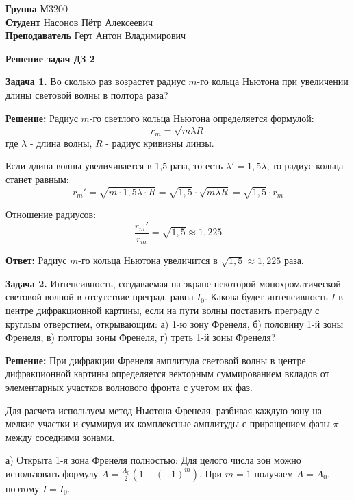 \documentclass[10pt]{article}
\begin{document}
	
	\textbf{Группа} М3200 \hfill\\[0.5cm]
	\textbf{Студент} Насонов Пётр Алексеевич \hfill  \\[0.5cm]
	\textbf{Преподаватель} Герт Антон Владимирович \hfill \\
	
	\vspace{1cm}
	
	\begin{center}
		{\LARGE \textbf{Решение задач ДЗ 2}}
	\end{center}
	
	\vspace{1cm}

\textbf{Задача 1.} Во сколько раз возрастет радиус $m$-го кольца Ньютона при увеличении длины световой волны в полтора раза?

\textbf{Решение:}
Радиус $m$-го светлого кольца Ньютона определяется формулой:
$$r_m = \sqrt{m\lambda R}$$
где $\lambda$ - длина волны, $R$ - радиус кривизны линзы.

Если длина волны увеличивается в 1,5 раза, то есть $\lambda' = 1,5\lambda$, то радиус кольца станет равным:
$$r_m' = \sqrt{m \cdot 1,5\lambda \cdot R} = \sqrt{1,5} \cdot \sqrt{m\lambda R} = \sqrt{1,5} \cdot r_m$$

Отношение радиусов:
$$\frac{r_m'}{r_m} = \sqrt{1,5} \approx 1,225$$

\textbf{Ответ:} Радиус $m$-го кольца Ньютона увеличится в $\sqrt{1,5} \approx 1,225$ раза.

\vspace{0.8cm}

\textbf{Задача 2.} Интенсивность, создаваемая на экране некоторой монохроматической световой волной в отсутствие преград, равна $I_0$. Какова будет интенсивность $I$ в центре дифракционной картины, если на пути волны поставить преграду с круглым отверстием, открывающим: а) 1-ю зону Френеля, б) половину 1-й зоны Френеля, в) полторы зоны Френеля, г) треть 1-й зоны Френеля?

\textbf{Решение:}
При дифракции Френеля амплитуда световой волны в центре дифракционной картины определяется векторным суммированием вкладов от элементарных участков волнового фронта с учетом их фаз.

Для расчета используем метод Ньютона-Френеля, разбивая каждую зону на мелкие участки и суммируя их комплексные амплитуды с приращением фазы $\pi$ между соседними зонами.

а) Открыта 1-я зона Френеля полностью:
Для целого числа зон можно использовать формулу $A = \frac{A_0}{2}(1 - (-1)^m)$.
При $m = 1$ получаем $A = A_0$, поэтому $I = I_0$.
\end{document}
